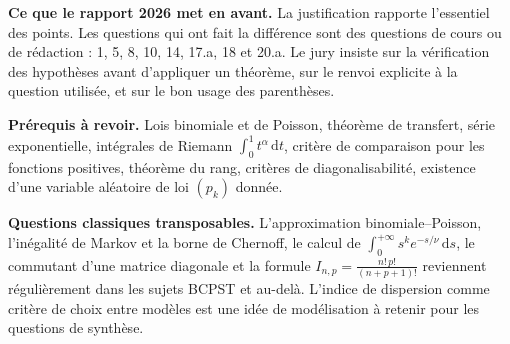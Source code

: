 \documentclass[11pt,a4paper]{article}
\begin{document}
\textbf{Ce que le rapport 2026 met en avant.} La justification rapporte l'essentiel des points. Les questions qui ont fait la différence sont des questions de cours ou de rédaction : 1, 5, 8, 10, 14, 17.a, 18 et 20.a. Le jury insiste sur la vérification des hypothèses avant d'appliquer un théorème, sur le renvoi explicite à la question utilisée, et sur le bon usage des parenthèses.

\textbf{Prérequis à revoir.} Lois binomiale et de Poisson, théorème de transfert, série exponentielle, intégrales de Riemann \(\int_0^1t^\alpha\,\mathrm dt\), critère de comparaison pour les fonctions positives, théorème du rang, critères de diagonalisabilité, existence d'une variable aléatoire de loi \((p_k)\) donnée.

\textbf{Questions classiques transposables.} L'approximation binomiale--Poisson, l'inégalité de Markov et la borne de Chernoff, le calcul de \(\int_0^{+\infty}s^ke^{-s/\nu}\,\mathrm ds\), le commutant d'une matrice diagonale et la formule \(I_{n,p}=\frac{n!\,p!}{(n+p+1)!}\) reviennent régulièrement dans les sujets BCPST et au-delà. L'indice de dispersion comme critère de choix entre modèles est une idée de modélisation à retenir pour les questions de synthèse.
\end{document}
